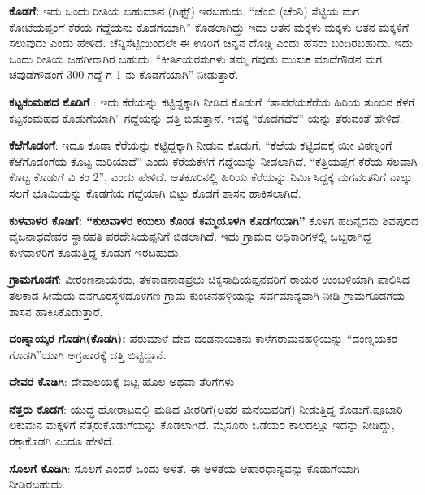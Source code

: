 \textbf{ಕೊಡಗೆ: } ಇದು ಒಂದು ರೀತಿಯ ಬಹುಮಾನ (ಗಿಫ್ಟ್​) ಇರಬಹುದು.\textbf{ }“ಚೆಂಬಿ (ಚೆಂನಿ) ಸೆಟ್ಟಿಯ ಮಗ ಕೋಟೆಯಪ್ಪಂಗೆ ಕೆರೆಯ ಗದ್ದೆಯನು ಕೊಡಗೆಯಾಗಿ” ಕೊಡಲಾಗಿದ್ದು ಇದು ಆತನ ಮಕ್ಕಳು ಮಕ್ಕಳು ಆತನ ಮಕ್ಕಳಿಗೆ ಸಲುವುದು ಎಂದು ಹೇಳಿದೆ. ಚೆನ್ನಿಸೆಟ್ಟಿಯಿಂದಲೇ ಈ ಊರಿಗೆ ಚಿನ್ನನ ದೊಡ್ಡಿ ಎಂದು ಹೆಸರು ಬಂದಿರಬಹುದು. ಇದು ಒಂದು ರೀತಿಯ ಜಹಗೀರಾಗಿರ ಬಹುದು. “ಕೀರ್ತಿಯರಸುಗಳು ತಮ್ಮ ಗವುಡು ಮುಸುಕ ಮಾದೆಗೌಡನ ಮಗ ಚವುಡೆಗೌಡಂಗೆ 300 ಗದ್ದೆ ಗ 1 ನು ಕೊಡಗೆಯಾಗಿ” ನೀಡುತ್ತಾರೆ.

\textbf{ಕಟ್ಟಕಂಮಹದ ಕೊಡಿಗೆ} : ಇದು ಕೆರೆಯನ್ನು ಕಟ್ಟಿದ್ದಕ್ಕಾಗಿ ನೀಡಿದ ಕೊಡುಗೆ “ತಾವರೆಯಕೆರೆಯ ಹಿರಿಯ ತುಂಬಿನ ಕೆಳಗೆ ಕಟ್ಟಕಂಮಹದ ಕೊಡುಗೆಯಾಗಿ” ಗದ್ದೆಯನ್ನು ದತ್ತಿ ಬಿಡುತ್ತಾನೆ. ಇದಕ್ಕೆ “ಕೊಡಗೆದೆರೆ” ಯನ್ನು ತೆರುವಂತೆ ಹೇಳಿದೆ.

\textbf{ಕೆಱೆಗೊಡಂಗೆ}: ಇದೂ ಕೂಡಾ ಕೆರೆಯನ್ನು ಕಟ್ಟಿದ್ದಕ್ಕಾಗಿ ನೀಡುವ ಕೊಡುಗೆ. “ಕೆಱೆಯ ಕಟ್ಟಿದದಕ್ಕೆ ಯೀ ವಿಠಣ್ನಂಗೆ ಕೆಱೆಗೊಡಂಗೆಯ ಕೊಟ್ಟ ಮರಿಯಾದೆ” ಎಂದು ಕೆರೆಯಕೆಳಗೆ ಗದ್ದೆಯನ್ನು ನೀಡಲಾಗಿದೆ. “ಕೆತ್ತಿಯಪ್ಪಗೆ ಕೆರೆಯ ಸೆಲವಾಗಿ ಕೊಟ್ಟ ಕೊಡುಗೆ ವಿ ಕಂ 2”, ಎಂದು ಹೇಳಿದೆ. ಆತಕೂರಿನಲ್ಲಿ ಹಿರಿಯ ಕೆರೆಯನ್ನು ನಿರ್ಮಿಸಿದ್ದಕ್ಕೆ ಮಗವಂತನಿಗೆ ನಾಲ್ಕು ಸಲಗೆ ಭೂಮಿಯನ್ನು ಕೊಡಗೆಯ ಗದ್ದೆಯಾಗಿ ಬಿಟ್ಟು ಕೊಡಗೆ ಶಾಸನ ಹಾಕಿಸಲಾಗಿದೆ.

\textbf{ಕುಳವಾಳರ ಕೊಡಿಗೆ: “ಕುೞವಾಳರ ಕಯಲು ಕೊಂಡ ಕಮ್ಮಯೊಳಗಿ ಕೊಡಗೆಯಾಗಿ”} ಕೊಳಗ ಹದಿನೈದನು ಶಿವಪುರದ ವೈಜನಾಥದೇವರ ಸ್ಥಾನಪತಿ ಪರದೇಸಿಯಪ್ಪನಿಗೆ ಬಿಡಲಾಗಿದೆ. ಇದು ಗ್ರಾಮದ ಅಧಿಕಾರಿಗಳಲ್ಲಿ ಒಬ್ಬರಾಗಿದ್ದ ಕುಳವಾಳರಿಗೆ ಕೊಡುತ್ತಿದ್ದ ಕೊಡುಗೆ ಇರಬಹುದು. 

\textbf{ಗ್ರಾಮಗೊಡಗೆ}: ವೀರಂಣನಾಯಕರು, ತಳಕಾಡನಾಡಪ್ರಭು ಚಿಕ್ಕಸಾಧಿಯಪ್ಪನವರಿಗೆ ರಾಯರ ಉಂಬಳಿಯಾಗಿ ಪಾಲಿಸಿದ ತಲಕಾಡ ಸೀಮೆಯ ದನಗೂರಸ್ಥಳದೊಳಗಣ ಗ್ರಾಮ ಕುಂಚನಹಳ್ಳಿಯನ್ನು ಸರ್ವಮಾನ್ಯವಾಗಿ ನೀಡಿ ಗ್ರಾಮಗೊಡಗೆಯ ಶಾಸನ ಹಾಕಿಸಿಕೊಡುತ್ತಾರೆ.

\textbf{ದಂಣ್ನಾಯ್ಕರ ಗೊಡಗಿ(ಕೊಡಗಿ):} ಪೆರುಮಾಳೆ ದೇವ ದಂಡನಾಯಕನು ಕಾಳೆಗರಾಮನಹಳ್ಳಿಯನ್ನು “ದಂಣ್ನಯಕರ ಗೊಡಗಿ”ಯಾಗಿ ಅಗ್ರಹಾರಕ್ಕೆ ದತ್ತಿ ಬಿಟ್ಟಿದ್ದಾನೆ.

\textbf{ದೇವರ ಕೊಡಿಗಿ}: ದೇವಾಲಯಕ್ಕೆ ಬಿಟ್ಟ ಹೊಲ ಅಥವಾ ತೆರಿಗೆಗಳು

\textbf{ನೆತ್ತರು ಕೊಡಗೆ}: ಯುದ್ಧ ಹೋರಾಟದಲ್ಲಿ ಮಡಿದ ವೀರರಿಗೆ(ಅವರ ಮನೆಯವರಿಗೆ) ನೀಡುತ್ತಿದ್ದ ಕೊಡುಗೆ\textbf{.}ಪೂಜಾರಿ ಲಕುಮನ ಮಕ್ಕಳಿಗೆ ನೆತ್ತರುಕೊಡುಗೆಯನ್ನು ಕೊಡಲಾಗಿದೆ. ಮೈಸೂರು ಒಡೆಯರ ಕಾಲದಲ್ಲೂ ಇದನ್ನು ನೀಡಿದ್ದು, ರಕ್ತಾಕೊಡಗಿ ಎಂದೂ ಹೇಳಿದೆ. 

\textbf{ಸೊಲಗೆ ಕೊಡಿಗಿ}: ಸೊಲಗೆ ಎಂದರೆ ಒಂದು ಅಳತೆ. ಈ ಅಳತೆಯ ಆಹಾರಧಾನ್ಯವನ್ನು ಕೊಡುಗೆಯಾಗಿ ನೀಡಿರಬಹುದು.


